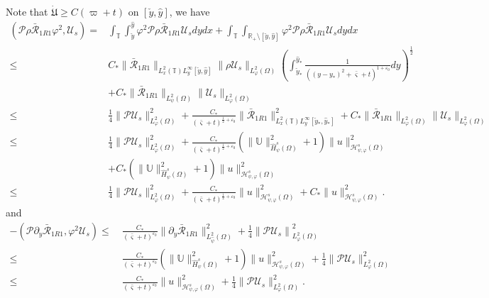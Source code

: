 \documentclass{amsart}
\numberwithin{equation}{section}
\begin{document}
Note that $\dot{\mathfrak{U}}\geq C(\varpi+t)$ on $[\check{y},\hat{y}]$, we have
\begin{align}\label{I671}
(\mathcal{P}\rho\bar{\mathcal{R}}_{1R1}\varphi^{2},\mathcal{U}_{s})
=& \int_{\mathbb{T}}\int_{\check{y}}^{\hat{y}}\varphi^{2}\mathcal{P}\rho\bar{\mathcal{R}}_{1R1}\mathcal{U}_{s}dydx
  +\int_{\mathbb{T}}\int_{\mathbb{R}_{+}\setminus[\check{y},\hat{y}]}\varphi^{2}\mathcal{P}\rho\bar{\mathcal{R}}_{1R1}\mathcal{U}_{s}dydx\\
\leq& C_{*}\|\bar{\mathcal{R}}_{1R1}\|_{L^{2}_{x}(\mathbb{T})L^{\infty}_{y}[\check{y},\hat{y}]}\|\rho\mathcal{U}_{s}\|_{L_{\varphi}^{2}(\Omega)}
       \left(\int_{\check{y}_{*}}^{\hat{y}_{*}}\frac{1}{((y-y_{*})^2+\bar{\varsigma}+t)^{1+\varepsilon_{0}}}dy\right)^{\frac{1}{2}}\nonumber\\
    &+C_{*}\|\bar{\mathcal{R}}_{1R1}\|_{L_{\psi}^{2}(\Omega)}\|\mathcal{U}_{s}\|_{L_{\varphi}^{2}(\Omega)}\nonumber\\
\leq& \frac{1}{4}\|\mathcal{P}\mathcal{U}_{s}\|_{L_{\varphi}^{2}(\Omega)}^{2}
     +\frac{C_{*}}{(\bar{\varsigma}+t)^{\frac{1}{2}+\varepsilon_{0}}}\|\bar{\mathcal{R}}_{1R1}\|_{L_{x}^{2}(\mathbb{T})L_{y}^{\infty}[\check{y}_{*},\hat{y}_{*}]}^{2}
     +C_{*}\|\bar{\mathcal{R}}_{1R1}\|_{L_{\varphi}^{2}(\Omega)}\|\mathcal{U}_{s}\|_{L_{\varphi}^{2}(\Omega)}\nonumber\\
\leq& \frac{1}{4}\|\mathcal{P}\mathcal{U}_{s}\|_{L_{\varphi}^{2}(\Omega)}^{2}
     +\frac{C_{*}}{(\bar{\varsigma}+t)^{\frac{1}{2}+\varepsilon_{0}}}\left(\|\mathbb{U}\|_{\hat{H}_{\psi}^{s}(\Omega)}^{2}+1\right)\|u\|_{\mathcal{H}_{\psi,\varphi}^{s}(\Omega)}^{2}\nonumber\\
    &+C_{*}\left(\|\mathbb{U}\|_{\hat{H}_{\psi}^{s}(\Omega)}^{2}+1\right)\|u\|_{\mathcal{H}_{\psi,\varphi}^{s}(\Omega)}^{2}\nonumber\\
\leq& \frac{1}{4}\|\mathcal{P}\mathcal{U}_{s}\|_{L_{\varphi}^{2}(\Omega)}^{2}
     +\frac{C_{*}}{(\bar{\varsigma}+t)^{\frac{1}{2}+\varepsilon_{0}}}\|u\|_{\mathcal{H}_{\psi,\varphi}^{s}(\Omega)}^{2}
     +C_{*}\|u\|_{\mathcal{H}_{\psi,\varphi}^{s}(\Omega)}^{2}.\nonumber
\end{align}
and
\begin{align}\label{I672}
-(\mathcal{P}\partial_{y}\bar{\mathcal{R}}_{1R1},\varphi^{2}\mathcal{U}_{s})
\leq&~\frac{C_{*}}{(\bar{\varsigma}+t)^{\varepsilon_{0}}}\|\partial_{y}\bar{\mathcal{R}}_{1R1}\|_{L_{\hat{\psi}}^{2}(\Omega)}^{2}
     +\frac{1}{4}\left\|\mathcal{P}\mathcal{U}_{s}\right\|_{L_{\varphi}^{2}(\Omega)}^{2}\\
\leq&~\frac{C_{*}}{(\bar{\varsigma}+t)^{\varepsilon_{0}}}\left(\|\mathbb{U}\|_{\hat{H}_{\psi}^{s}(\Omega)}^{2}+1\right)\|u\|_{\mathcal{H}_{\psi,\varphi}^{s}(\Omega)}^{2}
     +\frac{1}{4}\|\mathcal{P}\mathcal{U}_{s}\|_{L_{\varphi}^{2}(\Omega)}^{2}\nonumber\\
\leq&~\frac{C_{*}}{(\bar{\varsigma}+t)^{\varepsilon_{0}}}\|u\|_{\mathcal{H}_{\psi,\varphi}^{s}(\Omega)}^{2}
     +\frac{1}{4}\|\mathcal{P}\mathcal{U}_{s}\|_{L_{\varphi}^{2}(\Omega)}^{2}.\nonumber
\end{align}
\end{document}
